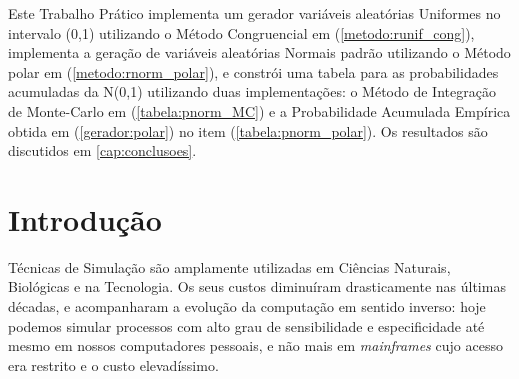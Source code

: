 \documentclass[
	article,			%
	12pt,				%
	twoside,			%
	a4paper,			%
	english,			%
	brazil,				%
	]{abntex2}
\begin{document}
\frenchspacing 


%
%
\maketitle

\begin{resumoumacoluna}
    Este Trabalho Prático implementa um gerador variáveis aleatórias Uniformes no intervalo (0,1) utilizando o Método Congruencial em (\ref{metodo:runif_cong}), implementa a geração de variáveis aleatórias Normais padrão utilizando o Método polar em (\ref{metodo:rnorm_polar}), e constrói uma tabela para as probabilidades acumuladas da N(0,1) utilizando duas implementações: o Método de Integração de Monte-Carlo em (\ref{tabela:pnorm_MC}) e a Probabilidade Acumulada Empírica obtida em (\ref{gerador:polar}) no item (\ref{tabela:pnorm_polar}). Os resultados são discutidos em \ref{cap:conclusoes}.
 
 \vspace{\onelineskip}
 
 \noindent
\end{resumoumacoluna}


\textual

\section{Introdução}
    Técnicas de Simulação são amplamente utilizadas em Ciências Naturais, Biológicas e na Tecnologia. Os seus custos diminuíram drasticamente nas últimas décadas, e acompanharam a evolução da computação em sentido inverso: hoje podemos simular processos com alto grau de sensibilidade e especificidade até mesmo em nossos computadores pessoais, e não mais em \textit{mainframes} cujo acesso era restrito e o custo elevadíssimo.
    
\end{document}
